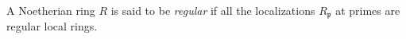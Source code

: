 \begin{definition}
\label{definition-regular}
A Noetherian ring $R$ is said to be {\it regular}
if all the localizations $R_{\mathfrak p}$ at primes are
regular local rings.
\end{definition}